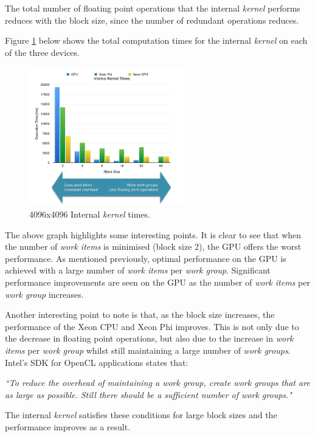 \par{The total number of floating point operations that the internal \emph{kernel} 
    performs reduces with the block size, since the number of redundant 
    operations reduces.}

\par{Figure \ref{InternalKernel1} below shows the total computation 
    times for the internal \emph{kernel} on each of the three devices.}

\begin{figure}[!h]
    \centering
    \includegraphics[width=0.6\textwidth]{figures/InternalKernel1.png}
    \caption{4096x4096 Internal \emph{kernel} times.}
    \label{InternalKernel1}
\end{figure}

\par{The above graph highlights some interesting points. It is clear to 
    see that when the number of \emph{work items} is minimised (block size 2), 
    the GPU offers the worst performance. As mentioned previously, optimal 
    performance on the GPU is achieved with a large number of \emph{work items} 
    per \emph{work group}. Significant performance improvements are seen on the GPU 
    as the number of \emph{work items} per \emph{work group} increases.}

\par{Another interesting point to note is that, as the block size 
    increases, the performance of the Xeon CPU and Xeon Phi improves. 
    This is not only due to the decrease in floating point operations, 
    but also due to the increase in \emph{work items} per \emph{work group} whilst still 
    maintaining a large number of \emph{work groups}. Intel’s SDK for OpenCL 
    applications states that:}

\par{\emph{``To reduce the overhead of maintaining a \emph{work group}, create 
    \emph{work groups} that are as large as possible. Still there should be 
    a sufficient number of \emph{work groups}."}}

\par{The internal \emph{kernel} satisfies these conditions for large block sizes 
    and the performance improves as a result.}

